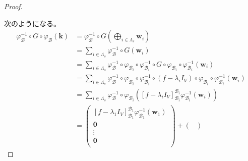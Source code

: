 \documentclass[dvipdfmx]{jsarticle}
\begin{document}
\begin{proof}
\begin{center}
\end{center}
次のようになる。
\begin{align*}
\varphi_{\mathcal{B}}^{- 1} \circ G \circ \varphi_{\mathcal{B}}\left( \mathbf{k} \right) &= \varphi_{\mathcal{B}}^{- 1} \circ G\left( \bigoplus_{i \in \varLambda_{s}} \mathbf{w}_{i} \right) \\
&= \sum_{i \in \varLambda_{s}} {\varphi_{\mathcal{B}}^{- 1} \circ G\left( \mathbf{w}_{i} \right)} \\
&= \sum_{i \in \varLambda_{s}} {\varphi_{\mathcal{B}}^{- 1} \circ \varphi_{\mathcal{B}_{i}} \circ \varphi_{\mathcal{B}_{i}}^{- 1} \circ G \circ \varphi_{\mathcal{B}_{i}} \circ \varphi_{\mathcal{B}_{i}}^{- 1}\left( \mathbf{w}_{i} \right)} \\
&= \sum_{i \in \varLambda_{s}} {\varphi_{\mathcal{B}}^{- 1} \circ \varphi_{\mathcal{B}_{i}} \circ \varphi_{\mathcal{B}_{i}}^{- 1} \circ \left( f - \lambda_{i}I_{V} \right) \circ \varphi_{\mathcal{B}_{i}} \circ \varphi_{\mathcal{B}_{i}}^{- 1}\left( \mathbf{w}_{i} \right)} \\
&= \sum_{i \in \varLambda_{s}} {\varphi_{\mathcal{B}}^{- 1} \circ \varphi_{\mathcal{B}_{i}}\left( \left[f - \lambda_{i}I_{V} \right]_{\mathcal{B}_{i}}^{\mathcal{B}_{i}}\varphi_{\mathcal{B}_{i}}^{- 1}\left( \mathbf{w}_{i} \right) \right)} \\
&= \begin{pmatrix}
\left[f - \lambda_{1}I_{V} \right]_{\mathcal{B}_{1}}^{\mathcal{B}_{1}}\varphi_{\mathcal{B}_{1}}^{- 1}\left( \mathbf{w}_{1} \right) \\
\mathbf{0} \\
 \vdots \\
\mathbf{0} \\
\end{pmatrix} + \begin{pmatrix}

\end{pmatrix}
\end{align*}
\end{proof}
\end{document}
